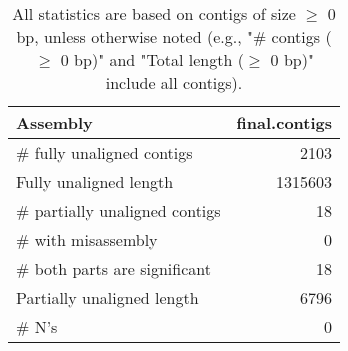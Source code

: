 \documentclass[12pt,a4paper]{article}
\begin{document}
\begin{table}[ht]
\begin{center}
\caption{All statistics are based on contigs of size $\geq$ 0 bp, unless otherwise noted (e.g., "\# contigs ($\geq$ 0 bp)" and "Total length ($\geq$ 0 bp)" include all contigs).}
\begin{tabular}{|l*{1}{|r}|}
\hline
Assembly & final.contigs \\ \hline
\# fully unaligned contigs & 2103 \\ \hline
Fully unaligned length & 1315603 \\ \hline
\# partially unaligned contigs & 18 \\ \hline
\hspace{5mm}\# with misassembly & 0 \\ \hline
\hspace{5mm}\# both parts are significant & 18 \\ \hline
Partially unaligned length & 6796 \\ \hline
\# N's & 0 \\ \hline
\end{tabular}
\end{center}
\end{table}
\end{document}
